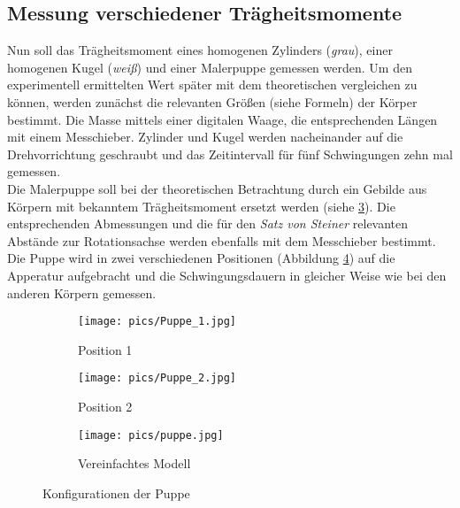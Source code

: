 \subsection{Messung verschiedener Trägheitsmomente}
Nun soll das Trägheitsmoment eines homogenen Zylinders (\textit{grau}), einer homogenen Kugel (\textit{weiß}) und einer %
Malerpuppe gemessen werden. Um den experimentell ermittelten Wert später mit dem theoretischen
vergleichen zu können, werden zunächst die relevanten Größen (siehe Formeln) der Körper
bestimmt. Die Masse mittels einer digitalen Waage, die entsprechenden Längen mit einem
Messchieber. Zylinder und Kugel werden nacheinander auf die Drehvorrichtung geschraubt und
das Zeitintervall für fünf Schwingungen zehn mal gemessen. \\
Die Malerpuppe soll bei der theoretischen Betrachtung durch ein Gebilde aus Körpern mit
bekanntem Trägheitsmoment ersetzt werden (siehe \ref{fig:pupmod}). Die entsprechenden Abmessungen und die für den \textit{Satz
von Steiner} relevanten Abstände zur Rotationsachse werden ebenfalls mit dem Messchieber bestimmt.
Die Puppe wird in zwei verschiedenen Positionen (Abbildung \ref{fig:konfig}) auf die Apperatur aufgebracht
und die Schwingungsdauern in gleicher Weise wie bei den anderen Körpern gemessen. \\

\begin{figure}
\centering
\begin{subfigure}{0.30\textwidth}
\centering
\texttt{[image: pics/Puppe\_1.jpg]}
\caption{Position 1}
\label{fig:pup1}
\end{subfigure}
\begin{subfigure}{0.30\textwidth}
\centering
\texttt{[image: pics/Puppe\_2.jpg]}
\caption{Position 2}
\label{fig:pup2}
\end{subfigure}
\begin{subfigure}{0.30\textwidth}
\centering
\texttt{[image: pics/puppe.jpg]}
\caption{Vereinfachtes Modell}
\label{fig:pupmod}
\end{subfigure}
\caption{Konfigurationen der Puppe}
\label{fig:konfig}
\end{figure}
